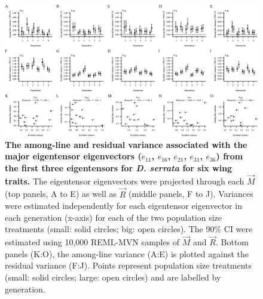 \newpage
\begin{landscape}
\begin{figure}[htp]
\begin{center}
\includegraphics[width=1.39\textwidth]{Chp3_Multi/MajorEigentensorEigVecs.eps}
\end{center}
\caption[The among-line and residual variance associated with the major eigentensor eigenvectors ($e_{11}$, $e_{16}$, $e_{21}$, $e_{31}$, $e_{36}$) from the first three eigentensors for \textit{D. serrata} for six wing traits.]{\textbf{The among-line and residual variance associated with the major eigentensor eigenvectors ($e_{11}$, $e_{16}$, $e_{21}$, $e_{31}$, $e_{36}$) from the first three eigentensors for \textit{D. serrata} for six wing traits.} The eigentensor eigenvectors were projected through each $\vec{M}$ (top panels, A to E) as well as $\vec{R}$ (middle panels, F to J). Variances were estimated independently for each eigentensor eigenvector in each generation (x-axis) for each of the two population size treatments (small: solid circles; big: open circles). The 90\% CI were estimated using 10,000 REML-MVN samples of $\vec{M}$ and $\vec{R}$. Bottom panels (K:O), the among-line variance (A:E) is plotted against the residual variance (F:J). Points represent population size treatments (small: solid circles; large: open circles) and are labelled by generation.}
\label{fig:multi_mjEigTenEigVecs}
\end{figure}
\end{landscape}
\FloatBarrier



